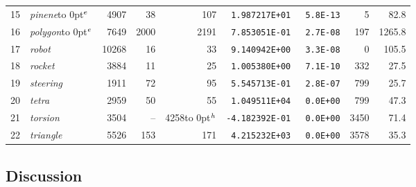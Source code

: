 \documentclass[draft,leqno,onefignum,onetabnum]{siamltex}
\def\strut{\rule[-1.25ex]{0pt}{4ex}}%
\def\strutl{\rule[-1.25ex]{0pt}{3ex}}%
\def\strutu{\rule{0pt}{3ex}}%
\def\AMPL  {{\small AMPL}}
\def\hp  {\hbox to 0pt{$\null^h$\hss}}
\def\acc {\hbox to 0pt{$\null^e$\hss}}
\def\Cute#1{\hbox{\it\lowercase{#1}\/}}
\def\n#1{{\tt #1}}
\begin{document}
\begin{table}[ht]
\begin{center}
\begin{tabular}{|c|l|r|r|r|r|c|r|r|}
\\           15&\Cute{pinene}\acc &  4907 &   38 &  107    &\n{ 1.987217E+01 }&\n{5.8E-13}  &    5 &  82.8
\\           16&\Cute{polygon}\acc&  7649 & 2000 & 2191    &\n{ 7.853051E-01 }&\n{2.7E-08}  &  197 &1265.8
\\           17&\Cute{robot}      & 10268 &   16 &   33    &\n{ 9.140942E+00 }&\n{3.3E-08}  &    0 & 105.5
\\           18&\Cute{rocket}     &  3884 &   11 &   25    &\n{ 1.005380E+00 }&\n{7.1E-10}  &  332 &  27.5
\\           19&\Cute{steering}   &  1911 &   72 &   95    &\n{ 5.545713E-01 }&\n{2.8E-07}  &  799 &  25.7
\\           20&\Cute{tetra}      &  2959 &   50 &   55    &\n{ 1.049511E+04 }&\n{0.0E+00}  &  799 &  47.3
\\           21&\Cute{torsion}    &  3504 &   -- & 4258\hp &\n{-4.182392E-01 }&\n{0.0E+00}  & 3450 &  71.4
\\\strutl    22&\Cute{triangle}   &  5526 &  153 &  171    &\n{ 4.215232E+03 }&\n{0.0E+00}  & 3578 &  35.3
\\\hline
\end{tabular}
\end{center}
\end{table}



 \subsection*{Discussion}
\end{document}
